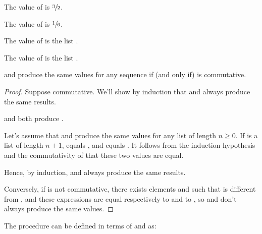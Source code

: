 \begin{exe}[2.38]
    The value of  is $\sfrac{3}{2}$.

    The value of  is $\sfrac{1}{6}$.

    The value of  is the list
    .

    The value of  is the list
    .

     and  produce the same values for any 
    sequence  if (and only if)  is commutative.

    \begin{proof}
        Suppose  commutative. We’ll show by induction that 
         and  always produce the same results.

         and
         both produce .

        Let’s assume that  and  produce the 
        same values for any list of length $n \geq 0$. If  is 
        a list of length $n + 1$,
         equals\linebreak
        , and
         equals
        . It 
        follows from the induction hypothesis and the commutativity of  
        that these two values are equal.

        Hence, by induction,  and  always 
        produce the same results.

        Conversely, if  is not commutative, there exists elements 
         and  such that  is different from
        , and these expressions are equal respectively to
         and to
        , so  and 
         don’t always produce the same values.
    \end{proof}
\end{exe}

\begin{exe}[2.39]
    The procedure  can be defined in terms of  and 
     as:
\end{exe}

